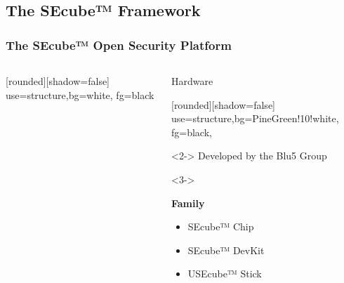 \documentclass[14pt,usenames,dvipsnames]{beamer}
\begin{document}

\subsection{The SEcube™ Framework}

\begin{frame}
  \frametitle{The SEcube™ Open Security Platform}
  \vspace{-0.3cm}

  \begin{columns}
	    \minipage[t][\textheight][t]{\columnwidth}
	    {[rounded][shadow=false]
	     {use=structure,bg=white,     fg=black}
	    
	    \begin{block}{Hardware}
	      {\fontsize{14pt}{14}\selectfont
				[rounded][shadow=false]
				 {use=structure,bg=PineGreen!10!white, fg=black,}
				\vspace{-0.3cm}
				
				\begin{block}<2->{}
	  			{Developed by the Blu5 Group}
				\end{block}
				
				\vspace{-0.2cm}
		
				\begin{block}<3->{}
				{
					\textbf{Family}
					\begin{itemize}
						\item SEcube™ Chip
						\item SEcube™ DevKit
						\item USEcube™ Stick
					\end{itemize}
				}
				\end{block}
				
				\vspace{-0.2cm}
				
}
\end{block}}
\end{columns}
\end{frame}
\end{document}
